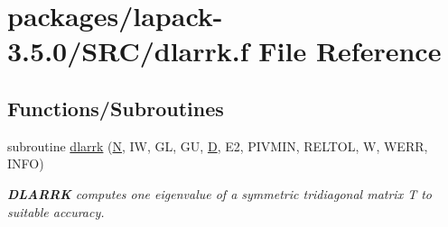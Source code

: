 \hypertarget{dlarrk_8f}{}\section{packages/lapack-\/3.5.0/\+S\+R\+C/dlarrk.f File Reference}
\label{dlarrk_8f}
\subsection*{Functions/\+Subroutines}
\begin{DoxyCompactItemize}
\item 
subroutine \hyperlink{group__auxOTHERauxiliary_gad321b234af8d1ac9fbb18ca95a1c13f2}{dlarrk} (\hyperlink{polmisc_8c_a0240ac851181b84ac374872dc5434ee4}{N}, I\+W, G\+L, G\+U, \hyperlink{odrpack_8h_a7dae6ea403d00f3687f24a874e67d139}{D}, E2, P\+I\+V\+M\+I\+N, R\+E\+L\+T\+O\+L, W, W\+E\+R\+R, I\+N\+F\+O)
\begin{DoxyCompactList}\small\item\em {\bfseries D\+L\+A\+R\+R\+K} computes one eigenvalue of a symmetric tridiagonal matrix T to suitable accuracy. \end{DoxyCompactList}\end{DoxyCompactItemize}
